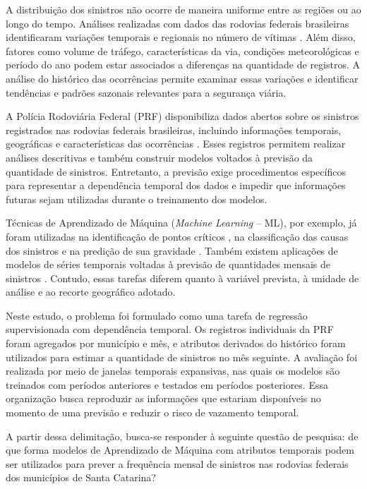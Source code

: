 \documentclass[12pt]{article}
\begin{document}
A distribuição dos sinistros não ocorre de maneira uniforme entre as regiões ou ao longo do tempo. Análises realizadas com dados das rodovias federais brasileiras identificaram variações temporais e regionais no número de vítimas \cite{andrade2019tendencia}. Além disso, fatores como volume de tráfego, características da via, condições meteorológicas e período do ano podem estar associados a diferenças na quantidade de registros. A análise do histórico das ocorrências permite examinar essas variações e identificar tendências e padrões sazonais relevantes para a segurança viária.

A Polícia Rodoviária Federal (PRF) disponibiliza dados abertos sobre os sinistros registrados nas rodovias federais brasileiras, incluindo informações temporais, geográficas e características das ocorrências \cite{prf2026dados}. Esses registros permitem realizar análises descritivas e também construir modelos voltados à previsão da quantidade de sinistros. Entretanto, a previsão exige procedimentos específicos para representar a dependência temporal dos dados e impedir que informações futuras sejam utilizadas durante o treinamento dos modelos.

Técnicas de Aprendizado de Máquina (\textit{Machine Learning} -- ML), por exemplo, já foram utilizadas na identificação de pontos críticos \cite{santos2021machine}, na classificação das causas dos sinistros \cite{rosa2024classificacao} e na predição de sua gravidade \cite{mafort2025tecnicas}. Também existem aplicações de modelos de séries temporais voltadas à previsão de quantidades mensais de sinistros \cite{getahun2021timeseries}. Contudo, essas tarefas diferem quanto à variável prevista, à unidade de análise e ao recorte geográfico adotado.

Neste estudo, o problema foi formulado como uma tarefa de regressão supervisionada com dependência temporal. Os registros individuais da PRF foram agregados por município e mês, e atributos derivados do histórico foram utilizados para estimar a quantidade de sinistros no mês seguinte. A avaliação foi realizada por meio de janelas temporais expansivas, nas quais os modelos são treinados com períodos anteriores e testados em períodos posteriores. Essa organização busca reproduzir as informações que estariam disponíveis no momento de uma previsão e reduzir o risco de vazamento temporal.

A partir dessa delimitação, busca-se responder à seguinte questão de pesquisa: de que forma modelos de Aprendizado de Máquina com atributos temporais podem ser utilizados para prever a frequência mensal de sinistros nas rodovias federais dos municípios de Santa Catarina?
\end{document}
